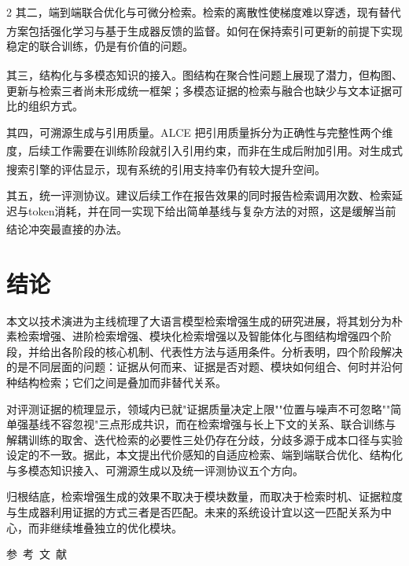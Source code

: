 \documentclass[10.5pt,compsoc,UTF8]{CjC}
\theoremstyle{mystyle}
\newcommand{\upcite}[1]{\textsuperscript{\cite{#1}}}
\begin{document}
\begin{multicols}{2}
其二，端到端联合优化与可微分检索。检索的离散性使梯度难以穿透，现有替代方案包括强化学习\upcite{jin2025search}与基于生成器反馈的监督\upcite{shi2023replug,lin2024dit}。如何在保持索引可更新的前提下实现稳定的联合训练，仍是有价值的问题。

其三，结构化与多模态知识的接入。图结构在聚合性问题上展现了潜力\upcite{edge2024from,guo2024lightrag,gutirrez2024hipporag}，但构图、更新与检索三者尚未形成统一框架；多模态证据的检索与融合也缺少与文本证据可比的组织方式。

其四，可溯源生成与引用质量。ALCE 把引用质量拆分为正确性与完整性两个维度\upcite{gao2023enabling}，后续工作需要在训练阶段就引入引用约束，而非在生成后附加引用。对生成式搜索引擎的评估显示，现有系统的引用支持率仍有较大提升空间\upcite{liu2023evaluating}。

其五，统一评测协议。建议后续工作在报告效果的同时报告检索调用次数、检索延迟与token消耗，并在同一实现下给出简单基线与复杂方法的对照，这是缓解当前结论冲突最直接的办法\upcite{ru2024ragchecker}。

\section{\heiti 结论}

本文以技术演进为主线梳理了大语言模型检索增强生成的研究进展，将其划分为朴素检索增强、进阶检索增强、模块化检索增强以及智能体化与图结构增强四个阶段，并给出各阶段的核心机制、代表性方法与适用条件。分析表明，四个阶段解决的是不同层面的问题：证据从何而来、证据是否对题、模块如何组合、何时并沿何种结构检索；它们之间是叠加而非替代关系。

对评测证据的梳理显示，领域内已就"证据质量决定上限""位置与噪声不可忽略""简单强基线不容忽视"三点形成共识，而在检索增强与长上下文的关系、联合训练与解耦训练的取舍、迭代检索的必要性三处仍存在分歧，分歧多源于成本口径与实验设定的不一致。据此，本文提出代价感知的自适应检索、端到端联合优化、结构化与多模态知识接入、可溯源生成以及统一评测协议五个方向。

归根结底，检索增强生成的效果不取决于模块数量，而取决于检索时机、证据粒度与生成器利用证据的方式三者是否匹配。未来的系统设计宜以这一匹配关系为中心，而非继续堆叠独立的优化模块。

\vspace {3mm}
\centerline{\textsf{参~考~文~献}}



\end{multicols}
\end{document}
